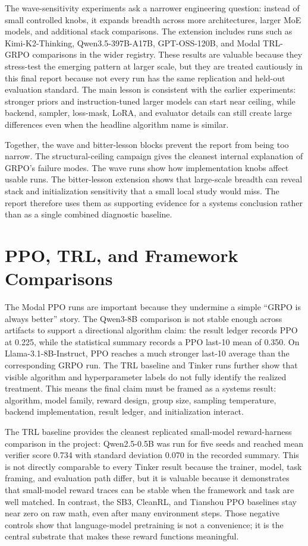 \documentclass[12pt,a4paper]{report}
\begin{document}
The wave-sensitivity experiments ask a narrower engineering question: instead of small controlled knobs, it expands breadth across more architectures, larger MoE models, and additional stack comparisons. The extension includes runs such as Kimi-K2-Thinking, Qwen3.5-397B-A17B, GPT-OSS-120B, and Modal TRL-GRPO comparisons in the wider registry. These results are valuable because they stress-test the emerging pattern at larger scale, but they are treated cautiously in this final report because not every run has the same replication and held-out evaluation standard. The main lesson is consistent with the earlier experiments: stronger priors and instruction-tuned larger models can start near ceiling, while backend, sampler, loss-mask, LoRA, and evaluator details can still create large differences even when the headline algorithm name is similar.

Together, the wave and bitter-lesson blocks prevent the report from being too narrow. The structural-ceiling campaign gives the cleanest internal explanation of GRPO's failure modes. The wave runs show how implementation knobs affect usable runs. The bitter-lesson extension shows that large-scale breadth can reveal stack and initialization sensitivity that a small local study would miss. The report therefore uses them as supporting evidence for a systems conclusion rather than as a single combined diagnostic baseline.

\section{PPO, TRL, and Framework Comparisons}
\label{sec:framework-comparisons}

The Modal PPO runs are important because they undermine a simple ``GRPO is always better'' story. The Qwen3-8B comparison is not stable enough across artifacts to support a directional algorithm claim: the result ledger records PPO at 0.225, while the statistical summary records a PPO last-10 mean of 0.350. On Llama-3.1-8B-Instruct, PPO reaches a much stronger last-10 average than the corresponding GRPO run. The TRL baseline and Tinker runs further show that visible algorithm and hyperparameter labels do not fully identify the realized treatment. This means the final claim must be framed as a systems result: algorithm, model family, reward design, group size, sampling temperature, backend implementation, result ledger, and initialization interact.

The TRL baseline provides the cleanest replicated small-model reward-harness comparison in the project: Qwen2.5-0.5B was run for five seeds and reached mean verifier score 0.734 with standard deviation 0.070 in the recorded summary. This is not directly comparable to every Tinker result because the trainer, model, task framing, and evaluation path differ, but it is valuable because it demonstrates that small-model reward traces can be stable when the framework and task are well matched. In contrast, the SB3, CleanRL, and Tianshou PPO baselines stay near zero on raw math, even after many environment steps. Those negative controls show that language-model pretraining is not a convenience; it is the central substrate that makes these reward functions meaningful.
\end{document}
